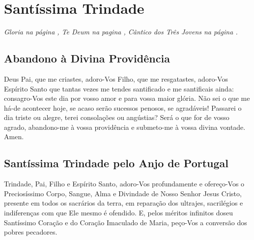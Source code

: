 \section{Santíssima Trindade}\label{trindade}

\emph{Gloria na página \pageref{gloria}, Te Deum na pagina \pageref{tedeum}, Cântico dos Três Jovens na página \pageref{benedicite}.}

\subsection{Abandono à Divina Providência}

 Deus Pai, que me criastes, adoro-Vos Filho, que me resgatastes, adoro-Vos Espírito Santo que tantas vezes me tendes santificado e me santificais ainda: consagro-Vos este dia por vosso amor e para vossa maior glória. Não sei o que me há-de acontecer hoje, se acaso serão sucessos penosos, se agradáveis! Passarei o dia triste ou alegre, terei consolações ou angústias? Será o que for de vosso agrado, abandono-me à vossa providência e submeto-me à vossa divina vontade. Amen.

\subsection{Santíssima Trindade pelo Anjo de Portugal}\label{fatimatrindade}
 Trindade, Pai, Filho e Espírito Santo, adoro-Vos profundamente e ofereço-Vos o Preciosíssimo Corpo, Sangue, Alma e Divindade de Nosso Senhor Jesus Cristo, presente em todos os sacrários da terra, em reparação dos ultrajes, sacrilégios e indiferenças com que Ele mesmo é ofendido. E, pelos méritos infinitos doseu Santíssimo Coração e do Coração Imaculado de Maria, peço-Vos a conversão dos pobres pecadores.
